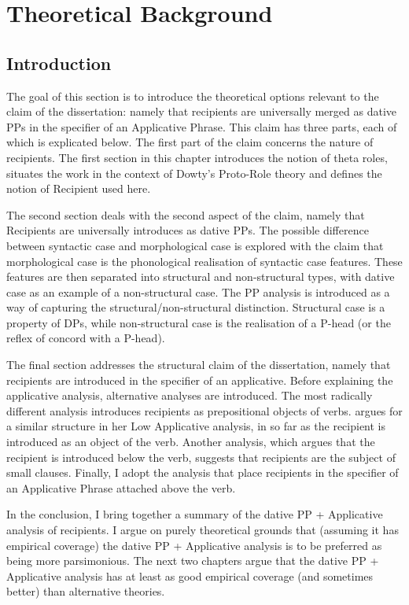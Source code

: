 \chapter{Theoretical Background}
\label{ch:theoryback}
\section{Introduction}
The goal of this section is to introduce the theoretical options relevant to the claim of the dissertation: namely that recipients are universally merged as dative PPs in the specifier of an Applicative Phrase. This claim has three parts, each of which is explicated below. The first part of the claim concerns the nature of recipients. The first section in this chapter introduces the notion of theta roles, situates the work in the context of Dowty's Proto-Role theory and defines the notion of Recipient used here.

The second section deals with the second aspect of the claim, namely that Recipients are universally introduces as dative PPs. The possible difference between syntactic case and morphological case is explored with the claim that morphological case is the phonological realisation of syntactic case features. These features are then separated into structural and non-structural types, with dative case as an example of a non-structural case. The PP analysis is introduced as a way of capturing the structural/non-structural distinction. Structural case is a property of DPs, while non-structural case is the realisation of a P-head (or the reflex of concord with a P-head).

The final section addresses the structural claim of the dissertation, namely that recipients are introduced in the specifier of an applicative. Before explaining the applicative analysis, alternative analyses are introduced. The most radically different analysis introduces recipients as prepositional objects of verbs. \cite{Pylkkanen.2001} argues for a similar structure in her Low Applicative analysis, in so far as the recipient is introduced as an object of the verb. Another analysis, which argues that the recipient is introduced below the verb, suggests that recipients are the subject of small clauses. Finally, I adopt the analysis that place recipients in the specifier of an Applicative Phrase attached above the verb.

In the conclusion, I bring together a summary of the dative PP + Applicative analysis of recipients. I argue on purely theoretical grounds that (assuming it has empirical coverage) the dative PP + Applicative analysis is to be preferred as being more parsimonious. The next two chapters argue that the dative PP + Applicative analysis has at least as good empirical coverage (and sometimes better) than alternative theories.

